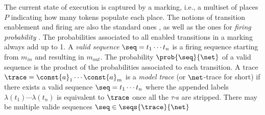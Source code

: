 The current state of execution is captured by a marking, i.e., a multiset of places $P$ indicating how many tokens populate each place.
The notions of transition enablement and firing are also the standard ones  \cite{MarsanCB84}, as well as the ones for \textit{firing probability} \cite{spdwe}. %
%
The probabilities associated to all enabled transitions in a marking always add up to 1.
 A \emph{valid sequence} $\seq = t_1\cdots t_n$ is a firing sequence starting from $m_{in}$ and resulting in $m_{out}$. The probability $\prob{\seq}{\net}$ of a valid sequence is the product of the probabilities associated to each transition.%
  A trace $\trace=\const{a}_1\cdots \const{a}_m$ is a \emph{model trace} (or $\net$-trace for short) if there exists a valid sequence $\seq = t_1\cdots t_n$ where the appended labels $\lambda(t_1)\cdots \lambda(t_n)$ is equivalent to $\trace$ once all the $\tau$-s are stripped.
  There may be multiple valide sequences $\seq\in\seqs{\trace}{\net}$ %
